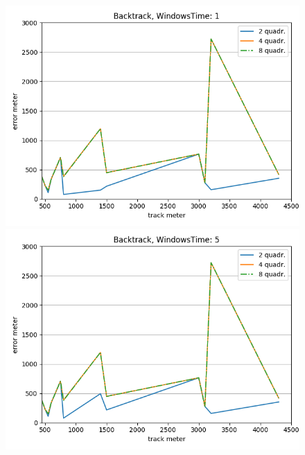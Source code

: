 \documentclass[12pt,a4paper,openright,twoside]{report}
\begin{document}
\begin{figure}[H]
\centering 
\includegraphics[scale=0.4]{thirdChartBacktrack-1} 
\includegraphics[scale=0.4]{thirdChartBacktrack-5} 
\end{figure}
\end{document}
